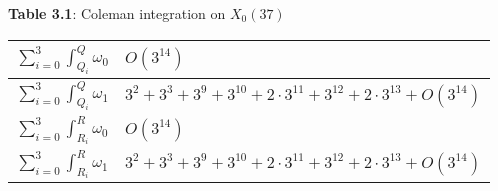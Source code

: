 \begin{center}
    \textbf{Table 3.1}: Coleman integration on $X_0(37)$
    \end{center}
\begin{table}[htb]\label{table:X_0_37_results}
\centering

    \begin{tabular}{|l|l|}
    \hline
    \rule{0pt}{4ex}    
        $\sum_{i=0}^{3}\int^Q_{Q_i} \omega_0 $   &$O(3^{14}) $
            \rule{0pt}{4ex} \\
\hline
            \rule{0pt}{4ex}
        $\sum_{i=0}^{3}\int^Q_{Q_i} \omega_1 $  & $3^{2} + 3^{3} + 3^{9} + 3^{10} + 2\cdot 3^{11} +  3^{12} + 2\cdot 3^{13}+ O(3^{14})$
            \rule{0pt}{4ex}
\\\hline
            \rule{0pt}{4ex}
       $\sum_{i=0}^{3}\int^R_{R_i} \omega_0 $  &$O(3^{14}) $    \rule{0pt}{4ex}    
\\\hline
           \rule{0pt}{4ex}    
        $\sum_{i=0}^{3}\int^R_{R_i} \omega_1 $ &$3^{2} + 3^{3} + 3^{9} + 3^{10} + 2\cdot 3^{11} +  3^{12} + 2\cdot 3^{13}+ O(3^{14})$      \rule{0pt}{4ex}    
\\\hline            
    \end{tabular}
\end{table}

